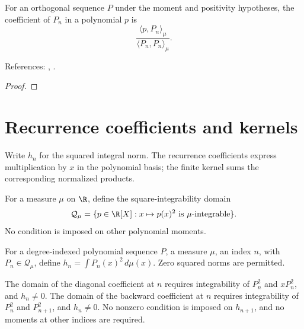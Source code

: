\begin{theorem}
\label{thm:general-coordinates}
\leanok
For an orthogonal sequence $P$ under the moment and positivity hypotheses,
the coefficient of $P_n$ in a polynomial $p$ is
\[\frac{\langle p,P_n\rangle_\mu}{\langle P_n,P_n\rangle_\mu}.\]

References: \cite[18.2(i)]{dlmf}, \cite[Chapter 3]{szego}.
\end{theorem}
\begin{proof}
\leanok
\end{proof}

\section{Recurrence coefficients and kernels}\label{sec:textbook-general-recurrence}

Write $h_n$ for the squared integral norm. The recurrence coefficients express multiplication by $x$ in the polynomial basis; the finite kernel sums the corresponding normalized products.

\begin{definition}
\label{def:integrable-polynomial-square}
\leanok
For a measure $\mu$ on $\R$, define the square-integrability domain
\[
\mathcal Q_\mu=\{p\in\R[X]:x\mapsto p(x)^2\text{ is }\mu\text{-integrable}\}.
\]
No condition is imposed on other polynomial moments.
\end{definition}

\begin{definition}
\label{def:general-squared-norm}
\leanok
For a degree-indexed polynomial sequence $P$, a measure $\mu$, an index $n$,
with $P_n\in\mathcal Q_\mu$, define $h_n=\int P_n(x)^2\,d\mu(x)$.
Zero squared norms are permitted.
\end{definition}

\begin{definition}
\label{def:recurrence-coefficient-input}
\leanok
The domain of the diagonal coefficient at $n$ requires integrability of $P_n^2$ and
$xP_n^2$, and $h_n\ne0$. The domain of the backward coefficient at $n$ requires
integrability of $P_n^2$ and $P_{n+1}^2$, and $h_n\ne0$.
No nonzero condition is imposed on $h_{n+1}$, and no moments at other
indices are required.
\end{definition}

